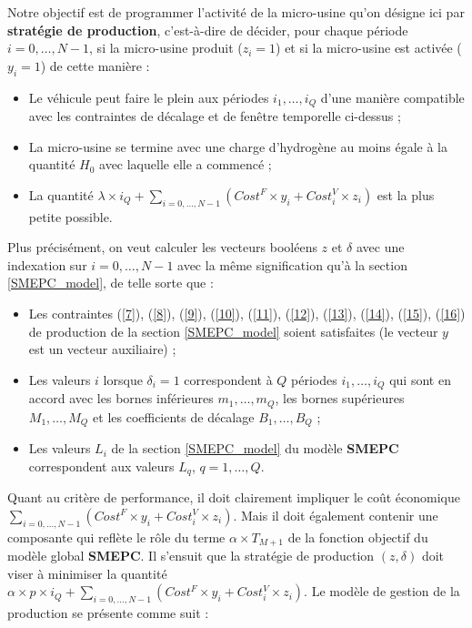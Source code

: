 Notre objectif est de programmer l'activité de la micro-usine  qu'on désigne ici par \textbf{stratégie de production}, c'est-à-dire de décider, pour chaque période $i = 0, \dots,N-1$, si la micro-usine produit ($z_i = 1$) et si la micro-usine est activée ($y_i = 1$) de cette manière :
\begin{itemize}[label=$\square$]

	\item Le véhicule peut faire le plein aux périodes $i_1, \dots, i_Q$ d'une manière compatible avec les contraintes de décalage et de fenêtre temporelle ci-dessus ;
	\item La micro-usine se termine avec une charge d'hydrogène au moins égale à la quantité $H_0$ avec laquelle elle a commencé ; 
	\item La quantité $\lambda \times i_Q + \sum_{i = 0, \dots,N -1} (Cost^F\times y_i + Cost^V_i\times z_i) $ est la plus petite possible.
\end{itemize}

Plus précisément, on veut calculer les vecteurs booléens $z$ et $\delta$ avec une indexation sur $i = 0, \dots, N-1$ avec la même signification qu'à la section \ref{SMEPC_model}, de telle sorte que :
\begin{itemize}[label=$\square$]
	\item Les contraintes (\ref{7}), (\ref{8}), (\ref{9}), (\ref{10}), (\ref{11}), (\ref{12}), (\ref{13}), (\ref{14}), (\ref{15}), (\ref{16}) de production de la section \ref{SMEPC_model} soient satisfaites (le vecteur $y$ est un vecteur auxiliaire) ;
	\item Les valeurs $i$ lorsque $\delta_i = 1$ correspondent à $Q$ périodes $i_1,\dots, i_Q$ qui sont en accord avec les bornes inférieures $m_1,\dots, m_Q$, les bornes supérieures $M_1,\dots, M_Q$ et les coefficients de décalage $B_1, \dots, B_Q$ ;
	\item Les valeurs $L_i$ de la section \ref{SMEPC_model} du modèle \textbf{SMEPC} correspondent aux valeurs $L_q$, $q = 1, \dots, Q$. 
\end{itemize}




Quant au critère de performance, il doit clairement impliquer le coût économique $\sum_{i = 0, \dots, N -1} (Cost^F\times y_i + Cost^V_i \times z_i)$. Mais il doit également contenir une composante qui reflète le rôle du terme $\alpha \times T_{M + 1}$ de la fonction objectif du modèle global \textbf{SMEPC}. Il s'ensuit que la stratégie de production $(z, \delta)$ doit viser à minimiser la quantité $\alpha\times p\times i_Q + \sum_{ i = 0, \dots, N -1} (Cost^F\times y_i + Cost^V_i\times z_i)$. Le modèle de gestion de la production se présente comme suit :

